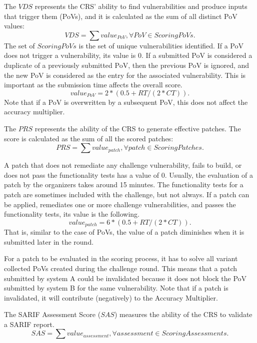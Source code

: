 The $VDS$ represents the CRS' ability to find vulnerabilities and produce inputs that trigger them (PoVs), and it is calculated as the sum of all distinct PoV values:
\begin{equation}
VDS = \sum value_{PoV}, \forall PoV \in ScoringPoVs.
\end{equation}
The set of $ScoringPoVs$ is the set of unique vulnerabilities identified.
If a PoV does not trigger a vulnerability, its value is 0.
If a submitted PoV is considered a duplicate of a previously submitted PoV, then the previous PoV is ignored, and the new PoV is considered as the entry for the associated vulnerability.
This is important as the submission time affects the overall score.
\begin{equation}
value_{PoV} = 2 * (0.5 + RT/(2*CT)).
\end{equation}
Note that if a PoV is overwritten by a subsequent PoV, this does not affect the accuracy multiplier.

The $PRS$ represents the ability of the CRS to generate effective patches.
The score is calculated as the sum of all the scored patches:
\begin{equation}
PRS = \sum value_{patch}, \forall patch \in ScoringPatches.
\end{equation}

A patch that does not remediate any challenge vulnerability,  fails to build, or does not pass the functionality tests has a value of 0.
Usually, the evaluation of a patch by the organizers takes around 15 minutes.
The functionality tests for a patch are sometimes included with the challenge, but not always.
If a patch can be applied, remediates one or more challenge vulnerabilities, and passes the functionality tests, its value is the following.
\begin{equation}
value_{patch} = 6 * (0.5 + RT/(2*CT)).
\end{equation}
That is, similar to the case of PoVs, the value of a patch diminishes when it is submitted later in the round.

For a patch to be evaluated in the scoring process, it has to solve all variant collected PoVs created during the challenge round.
This means that a patch submitted by system A could be invalidated because it does not block the PoV submitted by system B for the same vulnerability.
Note that if a patch is invalidated, it will contribute (negatively) to the Accuracy Multiplier.

The SARIF Assessment Score ($SAS$) measures the ability of the CRS to validate a SARIF report.
\begin{equation}
SAS = \sum value_{assessment}, \forall assessment \in ScoringAssessments.
\end{equation}

